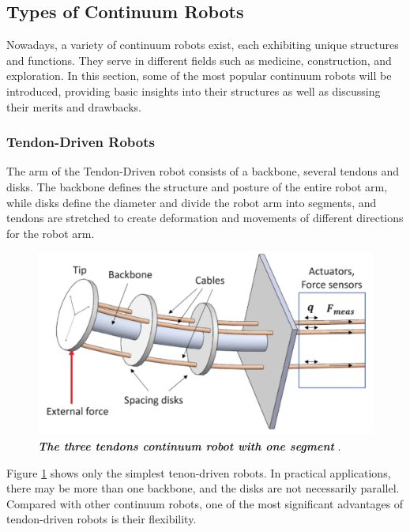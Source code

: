 \subsection{Types of Continuum Robots}
Nowadays, a variety of continuum robots exist, each exhibiting unique structures and functions. They serve in different fields 
such as medicine, construction, and exploration. In this section, some of the most popular continuum robots will be introduced, 
providing basic insights into their structures as well as discussing their merits and drawbacks. \\
\subsubsection{Tendon-Driven Robots}
The arm of the Tendon-Driven robot consists of a backbone, several tendons and disks. The backbone defines the structure and 
posture of the entire robot arm, while disks define the diameter and divide the robot arm into segments, and tendons are 
stretched to create deformation and movements of different directions for the robot arm. \\
\begin{figure}[H] %
    \centering %
    \captionsetup{labelsep=colon}
    \includegraphics[width=.9\textwidth]{Image/LR/3tendon_1segment_CR.PNG} 
    \caption[The three tendons continuum robot with one segment]
    {\centering \textit{\textbf{The three tendons continuum robot with one segment}} \cite{3tendon_1segment_CR}.}
    \label{fig:3tendon_1segment_CR}
\end{figure}
\noindent Figure \ref{fig:3tendon_1segment_CR} shows only the simplest tenon-driven robots. In practical applications, there 
may be more than one backbone, and the disks are not necessarily parallel. \\
Compared with other continuum robots, one of the most significant advantages of tendon-driven robots is their flexibility. 
